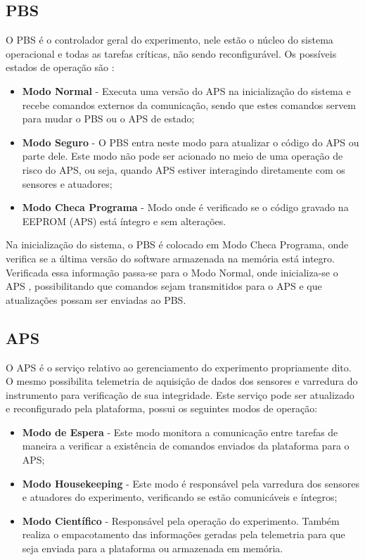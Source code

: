 \documentclass[journal,a4paper,oneside,twocolumn]{IEEEtran}
\begin{document}
\subsection{PBS}	

	 O PBS é o controlador geral do experimento, nele estão o núcleo do sistema operacional e todas as tarefas críticas, não sendo reconfigurável. Os possíveis estados de operação são :
		
		\begin{itemize}
			\item \textbf{Modo Normal }- Executa uma versão do APS na inicialização do sistema e recebe 	comandos externos da comunicação, sendo que estes comandos servem para mudar o PBS ou	o APS de estado;
						
			\item \textbf{Modo Seguro} - O PBS entra neste modo para atualizar o código do APS ou parte dele. Este modo não pode ser acionado no meio de uma operação de risco do APS, ou seja, quando APS estiver interagindo diretamente com os sensores e atuadores;
			
			\item \textbf{Modo Checa Programa} - Modo onde é verificado se o código gravado na EEPROM (APS) está íntegro e sem alterações.
		\end{itemize}

	Na inicialização do sistema, o PBS é colocado em Modo Checa Programa, onde verifica se a última versão do software armazenada na memória está integro. Verificada essa informação passa-se para o Modo Normal, onde inicializa-se o APS , possibilitando que comandos sejam transmitidos para o APS e que atualizações possam ser enviadas ao PBS.

\subsection{APS}		

	O APS é o serviço relativo ao gerenciamento do experimento propriamente dito. O mesmo possibilita telemetria de aquisição de dados dos sensores e varredura do instrumento para verificação de sua integridade. Este serviço pode ser atualizado e reconfigurado pela plataforma, possui os seguintes modos de operação:

	\begin{itemize}
		\item \textbf{Modo de Espera} - Este modo monitora a comunicação entre tarefas de maneira a verificar a existência de comandos enviados da plataforma para o APS;
		
		\item \textbf{Modo Housekeeping} - Este modo é responsável pela varredura dos sensores e atuadores do experimento, verificando se estão comunicáveis e íntegros;
		
		\item \textbf{Modo Científico} - Responsável pela operação do experimento. Também realiza o empacotamento das informações geradas pela telemetria para que seja enviada para a plataforma ou armazenada em memória.
	\end{itemize}
	
\end{document}
